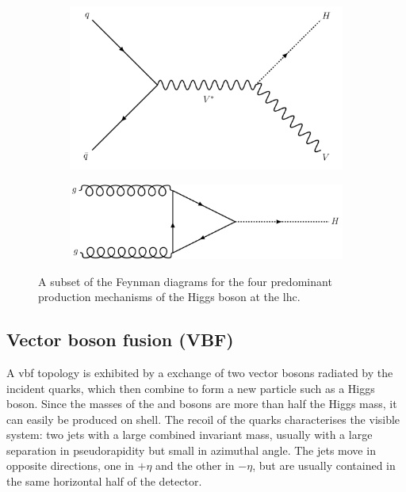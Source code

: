 \begin{figure}[htbp]
    \begin{subfigure}[b]{0.45\textwidth}
        \includegraphics[width=\textwidth]{figures/feynman_diagrams/VH.png}
        \caption{\VH}
    \end{subfigure}
    \hfill
    \begin{subfigure}[b]{0.45\textwidth}
        \includegraphics[width=\textwidth]{figures/feynman_diagrams/ggF.png}
        \caption{\ggF}
    \end{subfigure}
\caption[A subset of the Feynman diagrams for the four predominant production mechanisms of the Higgs boson at the LHC]{A subset of the Feynman diagrams for the four predominant production mechanisms of the Higgs boson at the \acrshort{lhc}.}
\label{fig:higgs_feynman_diagrams}
\end{figure}




\subsection{Vector boson fusion (VBF)}
\label{subsec:htoinv_VBF}

A \acrshort{vbf} topology is exhibited by a \tchannel exchange of two vector bosons radiated by the incident quarks, which then combine to form a new particle such as a Higgs boson. Since the masses of the \PW and \PZ bosons are more than half the Higgs mass, it can easily be produced on shell. The recoil of the quarks characterises the visible system: two \glspl{jet} with a large combined invariant mass, usually with a large separation in pseudorapidity but small in azimuthal angle. The \glspl{jet} move in opposite directions, one in $+\eta$ and the other in $-\eta$, but are usually contained in the same horizontal half of the detector.


